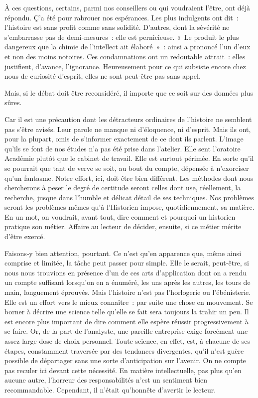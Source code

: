 \documentclass[french,twoside]{book} %
\begin{document}
\noindent À ces questions, certains, parmi nos conseillers ou qui voudraient l’être, ont déjà répondu. Ç’a été pour rabrouer nos espérances. Les plus indulgents ont dit : l’histoire est sans profit comme sans solidité. D’autres, dont la sévérité ne s’embarrasse pas de demi-mesures : elle est pernicieuse. « Le produit le plus dangereux que la chimie de l’intellect ait élaboré » : ainsi a prononcé l’un d’eux et non des moins notoires. Ces condamnations ont un redoutable attrait : elles justifient, d’avance, l’ignorance. Heureu­sement pour ce qui subsiste encore chez nous de curiosité d’esprit, elles ne sont peut‑être pas sans appel.\par
Mais, si le débat doit être reconsidéré, il importe que ce soit sur des données plus sûres.\par
Car il est une précaution dont les détracteurs ordinaires de l’histoire ne semblent pas s’être avisés. Leur parole ne manque ni d’éloquence, ni d’esprit. Mais ils ont, pour la plupart, omis de s’informer exactement de ce dont ils parlent. L’image qu’ils se font de nos études n’a pas été prise dans l’atelier. Elle sent l’oratoire Académie plutôt que le cabinet de travail. Elle est surtout périmée. En sorte qu’il se pourrait que tant de verve se soit, au bout du compte, dépensée à n’exorciser qu’un fan­tasme. Notre effort, ici, doit être bien différent. Les méthodes dont nous chercherons à peser le degré de certitude seront celles dont use, réellement,  
\label{pXIV} la recherche, jusque dans l’humble et délicat détail de ses techniques. Nos problèmes seront les problèmes mêmes qu’à l’Historien impose, quo­tidiennement, sa matière. En un mot, on voudrait, avant tout, dire com­ment et pourquoi un historien pratique son métier. Affaire au lecteur de décider, ensuite, si ce métier mérite d’être exercé.\par
Faisons‑y bien attention, pourtant. Ce n’est qu’en apparence que, même ainsi comprise et limitée, la tâche peut passer pour simple. Elle le serait, peut‑être, si nous nous trouvions en présence d’un de ces arts d’application dont on a rendu un compte suffisant lorsqu’on en a énuméré, les uns après les autres, les tours de main, longuement éprouvés. Mais l’histoire n’est pas l’horlogerie ou l’ébénisterie. Elle est un effort vers le mieux connaître : par suite une chose en mouvement. Se borner à décrire une science telle qu’elle se fait sera toujours la trahir un peu. Il est encore plus important de dire comment elle espère réussir progres­sivement à se faire. Or, de la part de l’analyste, une pareille entreprise exige forcément une assez large dose de choix personnel. Toute science, en effet, est, à chacune de ses étapes, constamment traversée par des tendances divergentes, qu’il n’est guère possible de départager sans une sorte d’anticipation sur l’avenir. On ne compte pas reculer ici devant cette nécessité. En matière intellectuelle, pas plus qu’en aucune autre, l’horreur des responsabilités n’est un sentiment bien recommandable. Cependant, il n’était qu’honnête d’avertir le lecteur.\par
\end{document}
